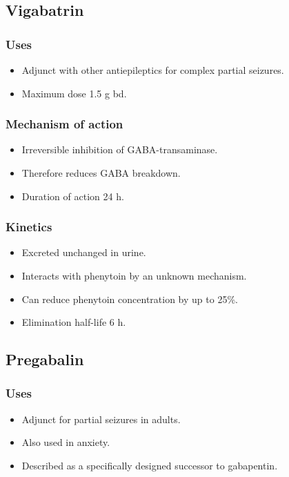 \documentclass[11pt,a4paper]{article}
\begin{document}
\subsection{Vigabatrin}

\subsubsection{Uses}
\begin{itemize}
  \item Adjunct with other antiepileptics for complex partial seizures.
  \item Maximum dose 1.5 g bd.
\end{itemize}

\subsubsection{Mechanism of action}
\begin{itemize}
  \item Irreversible inhibition of GABA-transaminase.
  \item Therefore reduces GABA breakdown.
  \item Duration of action 24 h.
\end{itemize}

\subsubsection{Kinetics}
\begin{itemize}
  \item Excreted unchanged in urine.
  \item Interacts with phenytoin by an unknown mechanism.
  \item Can reduce phenytoin concentration by up to 25\%.
  \item Elimination half-life 6 h.
\end{itemize}

\subsection{Pregabalin}

\subsubsection{Uses}
\begin{itemize}
  \item Adjunct for partial seizures in adults.
  \item Also used in anxiety.
  \item Described as a specifically designed successor to gabapentin.
\end{itemize}
\end{document}
